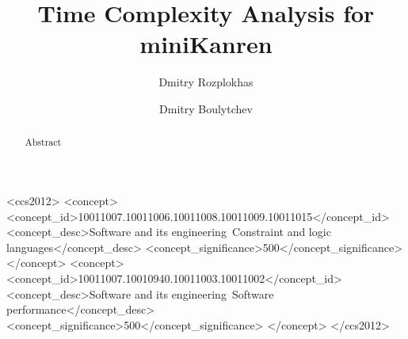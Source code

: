 \documentclass[acmsmall, anonymous, review]{acmart}
\newcommand{\mK}{miniKanren\xspace}
\begin{document}
\title{Time Complexity Analysis for \mK}

\author{Dmitry Rozplokhas}
\author{Dmitry Boulytchev}


\begin{abstract}
  Abstract
\end{abstract}

\begin{CCSXML}
<ccs2012>
<concept>
<concept_id>10011007.10011006.10011008.10011009.10011015</concept_id>
<concept_desc>Software and its engineering~Constraint and logic languages</concept_desc>
<concept_significance>500</concept_significance>
</concept>
<concept>
<concept_id>10011007.10010940.10011003.10011002</concept_id>
<concept_desc>Software and its engineering~Software performance</concept_desc>
<concept_significance>500</concept_significance>
</concept>
</ccs2012>
\end{CCSXML}


\end{document}
